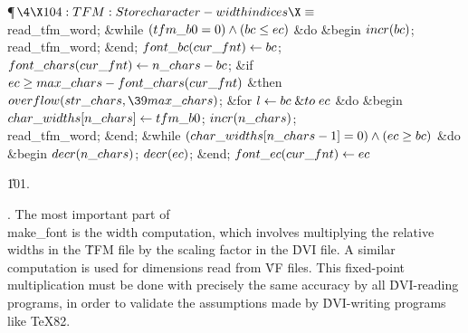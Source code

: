 \Y\P$\4\X104:TFM: Store character-width indices\X\S$\6
\\{read\_tfm\_word};\6
\&{while} $(\\{tfm\_b0}=0)\land(\\{bc}\le\\{ec})$ \1\&{do}\6
\&{begin} $\\{incr}(\\{bc})$;\5
\\{read\_tfm\_word};\6
\&{end};\2\6
$\\{font\_bc}(\\{cur\_fnt})\gets\\{bc}$;\5
$\\{font\_chars}(\\{cur\_fnt})\gets\\{n\_chars}-\\{bc}$;\6
\&{if} $\\{ec}\ge\\{max\_chars}-\\{font\_chars}(\\{cur\_fnt})$ \1\&{then}\5
$\\{overflow}(\\{str\_chars},\39\\{max\_chars})$;\2\6
\&{for} $\hbox{$l$}\gets\\{bc}\mathrel{\&{to}}\\{ec}$ \1\&{do}\6
\&{begin} $\\{char\_widths}[\\{n\_chars}]\gets\\{tfm\_b0}$;\5
$\\{incr}(\\{n\_chars})$;\5
\\{read\_tfm\_word};\6
\&{end};\2\6
\&{while} $(\\{char\_widths}[\\{n\_chars}-1]=0)\land(\\{ec}\ge\\{bc})$ \1\&{do}\6
\&{begin} $\\{decr}(\\{n\_chars})$;\5
$\\{decr}(\\{ec})$;\6
\&{end};\2\6
$\\{font\_ec}(\\{cur\_fnt})\gets\\{ec}$\par
\U101.\fi

. The most important part of \\{make\_font} is the width computation,
which
involves multiplying the relative widths in the \.{TFM} file by the
scaling factor in the \.{DVI} file. A similar computation is used for
dimensions read from \.{VF} files. This fixed-point multiplication must
be done with precisely the same accuracy by all \.{DVI}-reading programs,
in order to validate the assumptions made by \.{DVI}-writing programs
like \TeX82.


